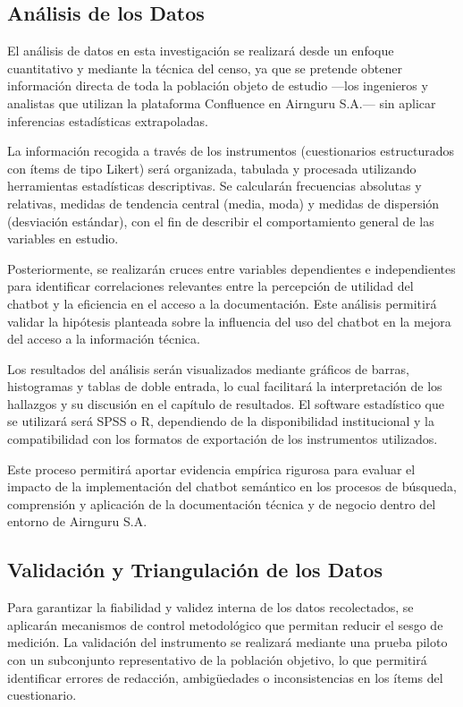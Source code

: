 \subsection{Análisis de los Datos}

El análisis de datos en esta investigación se realizará desde un enfoque cuantitativo y mediante la técnica del censo, ya que se pretende obtener información directa de toda la población objeto de estudio —los ingenieros y analistas que utilizan la plataforma Confluence en Airnguru S.A.— sin aplicar inferencias estadísticas extrapoladas.

La información recogida a través de los instrumentos (cuestionarios estructurados con ítems de tipo Likert) será organizada, tabulada y procesada utilizando herramientas estadísticas descriptivas. Se calcularán frecuencias absolutas y relativas, medidas de tendencia central (media, moda) y medidas de dispersión (desviación estándar), con el fin de describir el comportamiento general de las variables en estudio.

Posteriormente, se realizarán cruces entre variables dependientes e independientes para identificar correlaciones relevantes entre la percepción de utilidad del chatbot y la eficiencia en el acceso a la documentación. Este análisis permitirá validar la hipótesis planteada sobre la influencia del uso del chatbot en la mejora del acceso a la información técnica.

Los resultados del análisis serán visualizados mediante gráficos de barras, histogramas y tablas de doble entrada, lo cual facilitará la interpretación de los hallazgos y su discusión en el capítulo de resultados. El software estadístico que se utilizará será SPSS o R, dependiendo de la disponibilidad institucional y la compatibilidad con los formatos de exportación de los instrumentos utilizados.

Este proceso permitirá aportar evidencia empírica rigurosa para evaluar el impacto de la implementación del chatbot semántico en los procesos de búsqueda, comprensión y aplicación de la documentación técnica y de negocio dentro del entorno de Airnguru S.A.


\subsection{Validación y Triangulación de los Datos}

Para garantizar la fiabilidad y validez interna de los datos recolectados, se aplicarán mecanismos de control metodológico que permitan reducir el sesgo de medición. La validación del instrumento se realizará mediante una prueba piloto con un subconjunto representativo de la población objetivo, lo que permitirá identificar errores de redacción, ambigüedades o inconsistencias en los ítems del cuestionario.

